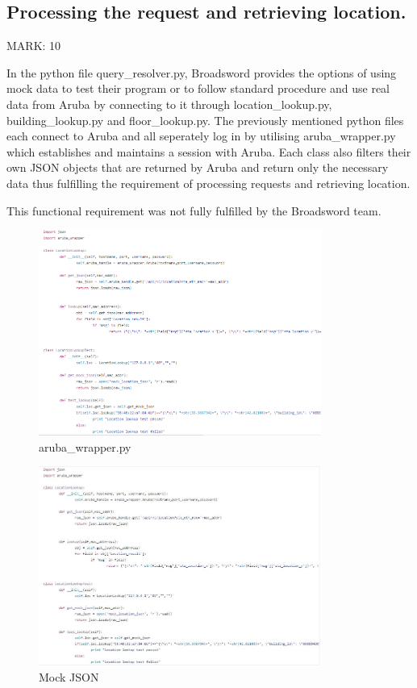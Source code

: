 \documentclass{article}
\begin{document}
\subsection{Processing the request and retrieving location.}

\begin{flushleft}MARK: 10\end{flushleft}
In the python file query\_resolver.py, Broadsword provides the options of using mock data to test their program or to follow standard procedure and use real data from Aruba by connecting to it through location\_lookup.py, building\_lookup.py and floor\_lookup.py. The previously mentioned python files each connect to Aruba and all seperately log in by utilising aruba\_wrapper.py which establishes and maintains a session with Aruba. Each class also filters their own JSON objects that are returned by Aruba and return only the necessary data thus fulfilling the requirement of processing requests and retrieving location.   
\begin{flushleft}This functional requirement was not fully fulfilled by the Broadsword team.\end{flushleft}
\begin{figure}[ht]
  \includegraphics[width=350px]{Images/getLoc.PNG}
  \caption{aruba\_wrapper.py}
  \label{fig:aruba\_wrapper.py}
\end{figure}
\begin{figure}[ht]
  \includegraphics[width=350px]{Images/LocLookup.JPG}
  \caption{Mock JSON}
  \label{Mock JSON}
\end{figure}
\end{document}
